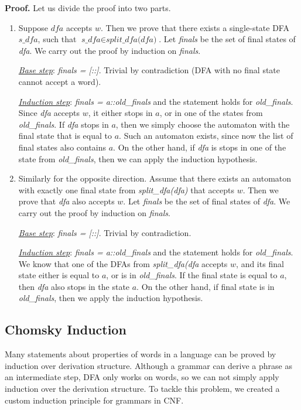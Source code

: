 \textbf{Proof.}
Let us divide the proof into two parts.
\begin{enumerate}
\item Suppose $\textit{dfa}$ accepts $w$. Then we prove that there exists a single-state DFA $\textit{s\_dfa}$, such that $\textit{s\_dfa} \in \textit{split\_dfa(dfa)}$. 
Let \textit{finals} be the set of final states of \textit{dfa}. We carry out the proof by induction on \textit{finals}. 


\textit{\underline{Base step}}: \textit{finals = [::]}. Trivial by contradiction (DFA with no final state cannot accept a word).

\textit{\underline{Induction step}}: \textit{finals = a::old\_finals} and the statement holds for \textit{old\_finals}. Since \textit{dfa} accepts $w$, it either stops in $a$, or in one of the states from \textit{old\_finals}.
If \textit{dfa} stops in $a$, then we simply choose the automaton with the final state that is equal to $a$.
Such an automaton exists, since now the list of final states also contains $a$.
On the other hand, if \textit{dfa} is stops in one of the state from \textit{old\_finals}, then we can apply the induction hypothesis.

\item Similarly for the opposite direction. Assume that there exists an automaton with exactly one final state from \textit{split\_dfa(dfa)} that accepts $w$. Then we prove that \textit{dfa} also accepts $w$. 
Let \textit{finals} be the set of final states of \textit{dfa}. We carry out the proof by induction on \textit{finals}. 


\textit{\underline{Base step}}: \textit{finals = [::]}. Trivial by contradiction.


\textit{\underline{Induction step}}: \textit{finals = a::old\_finals} and the statement holds for \textit{old\_finals}.
We know that one of the DFAs from \textit{split\_dfa(dfa} accepts $w$, and its final state either is equal to $a$, or is in \textit{old\_finals}.
If the final state is equal to $a$, then \textit{dfa} also stops in the state $a$.
On the other hand, if final state is in \textit{old\_finals}, then we apply the induction hypothesis.
\end{enumerate}


\subsection{Chomsky Induction}
\label{sec:chomsky-induction}

Many statements about properties of words in a language can be proved by induction over derivation structure. Although a grammar can derive a phrase as an intermediate step, DFA only works on words, so we can not simply apply induction over the derivation structure. To tackle this problem, we created a custom induction principle for grammars in CNF.


